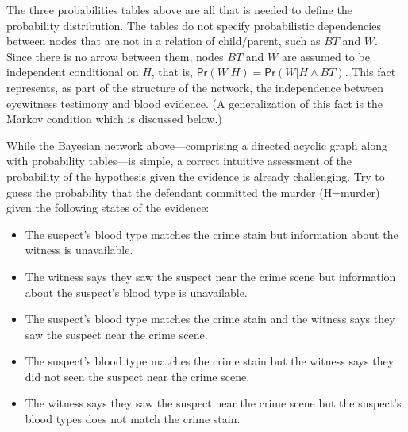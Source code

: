 \documentclass{article}
\newcommand{\pr}{\mathsf{Pr}}
\begin{document}
The three probabilities tables above are all that is needed to define the probability distribution. The tables do not specify probabilistic dependencies between nodes that are not in a relation of child/parent, such as $BT$ and $W$. Since there is no arrow between them, nodes $BT$ and $W$ are assumed to be independent conditional on $H$, that is, $\pr(W \vert H)=\pr(W \vert H \wedge BT)$. This fact represents, as part of the structure of the network, the independence between eyewitness testimony and  blood evidence. (A generalization of this fact
is the Markov condition which is discussed below.)

While the Bayesian network above---comprising a directed acyclic graph along with probability tables---is simple, a correct intuitive assessment of
the probability of the hypothesis given the
evidence is already challenging. Try to guess the probability that the defendant committed the murder (H=murder) given 
the following states of the
evidence:

\begin{itemize} 
\item The suspect's blood type matches the crime stain but  information about the witness is unavailable.
\item The witness says they saw the suspect near the crime scene but information about the suspect's blood type is unavailable.
\item The suspect's blood type matches the crime stain and the witness says they saw the suspect near the crime scene.
\item The suspect's blood type matches the crime stain but the witness says they did not seen the suspect near the crime scene.
\item The witness says they saw the suspect near the crime scene but the suspect's blood types does not match the crime stain. 
\end{itemize}

\end{document}
